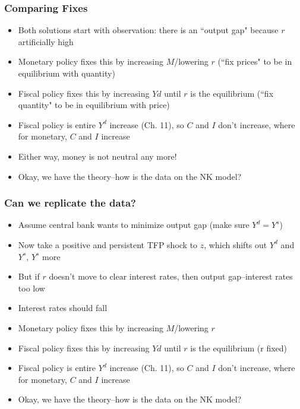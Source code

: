 \documentclass{beamer}
\begin{document}
\begin{frame}
\frametitle[alignment=center]{Comparing Fixes }
\begin{itemize}
\item Both solutions start with observation: there is an ``output gap" because $r$ artificially high
\bigskip
\item Monetary policy fixes this by increasing $M$/lowering $r$ (``fix prices" to be in equilibrium with quantity)
\bigskip
\item Fiscal policy fixes this by increasing $Yd$ until $r$ is the equilibrium (``fix quantity" to be in equilibrium with price)\bigskip
\item Fiscal policy is entire $Y^d$ increase (Ch. 11), so $C$ and $I$ don't increase, where for monetary, $C$ and $I$ increase
\bigskip
\item Either way, money is not neutral any more! 
\bigskip
\item Okay, we have the theory--how is the data on the NK model?
\end{itemize}
\end{frame}


\begin{frame}
\frametitle[alignment=center]{Can we replicate the data? }
\begin{itemize}
\item Assume central bank wants to minimize output gap (make sure $Y^d=Y^s$)
\bigskip
\item Now take a positive and persistent TFP shock to $z$, which shifts out $Y^d$ and $Y^s$, $Y^s$ more
\bigskip
\item But if $r$ doesn't move to clear interest rates, then output gap--interest rates too low
\bigskip
\item Interest rates should fall
\bigskip
\item Monetary policy fixes this by increasing $M$/lowering $r$
\bigskip
\item Fiscal policy fixes this by increasing $Yd$ until $r$ is the equilibrium (r fixed)
\bigskip
\item Fiscal policy is entire $Y^d$ increase (Ch. 11), so $C$ and $I$ don't increase, where for monetary, $C$ and $I$ increase 
\bigskip
\item Okay, we have the theory--how is the data on the NK model?
\end{itemize}
\end{frame}
\end{document}
